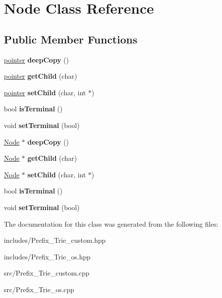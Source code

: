 \hypertarget{class_node}{}\section{Node Class Reference}
\label{class_node}
\subsection*{Public Member Functions}
\begin{DoxyCompactItemize}
\item 
\mbox{\label{class_node_a50cc8a8f7579baecb23595338140ef87}} 
\hyperlink{structpointer}{pointer} {\bfseries deep\+Copy} ()
\item 
\mbox{\label{class_node_a7d2c9441ae9f243e06d9f081bada8bad}} 
\hyperlink{structpointer}{pointer} {\bfseries get\+Child} (char)
\item 
\mbox{\label{class_node_aeb419eb3d59dba25f792546a226643bc}} 
\hyperlink{structpointer}{pointer} {\bfseries set\+Child} (char, int $\ast$)
\item 
\mbox{\label{class_node_a8cdae92d062555a32b908bfeae6149da}} 
bool {\bfseries is\+Terminal} ()
\item 
\mbox{\label{class_node_a6b9cb87985f29025ad3a2905f61e94c3}} 
void {\bfseries set\+Terminal} (bool)
\item 
\mbox{\label{class_node_a3d977b8e9de6d22bec1ab0e9962a2c41}} 
\hyperlink{class_node}{Node} $\ast$ {\bfseries deep\+Copy} ()
\item 
\mbox{\label{class_node_a8029130c13b941a582c6a7f29648fa36}} 
\hyperlink{class_node}{Node} $\ast$ {\bfseries get\+Child} (char)
\item 
\mbox{\label{class_node_a7ae9ef44097095d0e7d5923fe329523a}} 
\hyperlink{class_node}{Node} $\ast$ {\bfseries set\+Child} (char, int $\ast$)
\item 
\mbox{\label{class_node_a8cdae92d062555a32b908bfeae6149da}} 
bool {\bfseries is\+Terminal} ()
\item 
\mbox{\label{class_node_a6b9cb87985f29025ad3a2905f61e94c3}} 
void {\bfseries set\+Terminal} (bool)
\end{DoxyCompactItemize}


The documentation for this class was generated from the following files\+:\begin{DoxyCompactItemize}
\item 
includes/Prefix\+\_\+\+Trie\+\_\+custom.\+hpp\item 
includes/Prefix\+\_\+\+Trie\+\_\+os.\+hpp\item 
src/Prefix\+\_\+\+Trie\+\_\+custom.\+cpp\item 
src/Prefix\+\_\+\+Trie\+\_\+os.\+cpp\end{DoxyCompactItemize}

